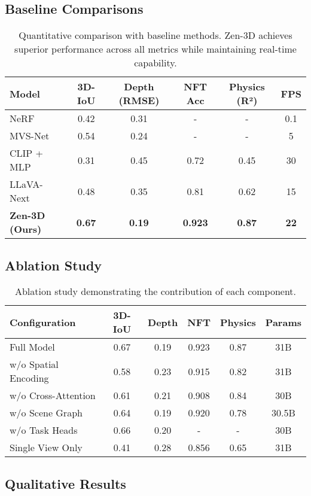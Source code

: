 \documentclass[11pt,a4paper]{article}
\begin{document}
\subsection{Baseline Comparisons}

\begin{table}[h]
\centering
\begin{tabular}{lccccc}
\toprule
Model & 3D-IoU & Depth (RMSE) & NFT Acc & Physics (R²) & FPS \\
\midrule
NeRF & 0.42 & 0.31 & - & - & 0.1 \\
MVS-Net & 0.54 & 0.24 & - & - & 5 \\
CLIP + MLP & 0.31 & 0.45 & 0.72 & 0.45 & 30 \\
LLaVA-Next & 0.48 & 0.35 & 0.81 & 0.62 & 15 \\
\midrule
\textbf{Zen-3D (Ours)} & \textbf{0.67} & \textbf{0.19} & \textbf{0.923} & \textbf{0.87} & \textbf{22} \\
\bottomrule
\end{tabular}
\caption{Quantitative comparison with baseline methods. Zen-3D achieves superior performance across all metrics while maintaining real-time capability.}
\end{table}

\subsection{Ablation Study}

\begin{table}[h]
\centering
\begin{tabular}{lccccc}
\toprule
Configuration & 3D-IoU & Depth & NFT & Physics & Params \\
\midrule
Full Model & 0.67 & 0.19 & 0.923 & 0.87 & 31B \\
\midrule
w/o Spatial Encoding & 0.58 & 0.23 & 0.915 & 0.82 & 31B \\
w/o Cross-Attention & 0.61 & 0.21 & 0.908 & 0.84 & 30B \\
w/o Scene Graph & 0.64 & 0.19 & 0.920 & 0.78 & 30.5B \\
w/o Task Heads & 0.66 & 0.20 & - & - & 30B \\
Single View Only & 0.41 & 0.28 & 0.856 & 0.65 & 31B \\
\bottomrule
\end{tabular}
\caption{Ablation study demonstrating the contribution of each component.}
\end{table}

\subsection{Qualitative Results}
\end{document}
